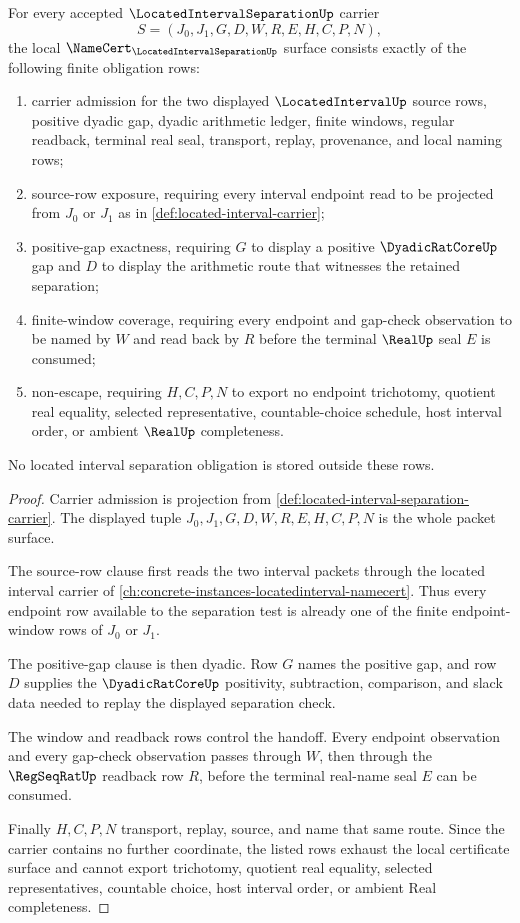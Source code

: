 \begin{theorem}
\label{thm:located-interval-separation-namecert-obligations}
For every accepted $\LocatedIntervalSeparationUp$ carrier
$$
S=(J_0,J_1,G,D,W,R,E,H,C,P,N),
$$
the local $\NameCert_{\LocatedIntervalSeparationUp}$ surface consists exactly of the following finite obligation rows:
\begin{enumerate}
\item carrier admission for the two displayed $\LocatedIntervalUp$ source rows, positive dyadic gap, dyadic arithmetic ledger, finite windows, regular readback, terminal real seal, transport, replay, provenance, and local naming rows;
\item source-row exposure, requiring every interval endpoint read to be projected from $J_0$ or $J_1$ as in \autoref{def:located-interval-carrier};
\item positive-gap exactness, requiring $G$ to display a positive $\DyadicRatCoreUp$ gap and $D$ to display the arithmetic route that witnesses the retained separation;
\item finite-window coverage, requiring every endpoint and gap-check observation to be named by $W$ and read back by $R$ before the terminal $\RealUp$ seal $E$ is consumed;
\item non-escape, requiring $H,C,P,N$ to export no endpoint trichotomy, quotient real equality, selected representative, countable-choice schedule, host interval order, or ambient $\RealUp$ completeness.
\end{enumerate}
No located interval separation obligation is stored outside these rows.
\end{theorem}
\begin{proof}
Carrier admission is projection from \autoref{def:located-interval-separation-carrier}. The displayed tuple $J_0,J_1,G,D,W,R,E,H,C,P,N$ is the whole packet surface.

The source-row clause first reads the two interval packets through the located interval carrier of \autoref{ch:concrete-instances-locatedinterval-namecert}. Thus every endpoint row available to the separation test is already one of the finite endpoint-window rows of $J_0$ or $J_1$.

The positive-gap clause is then dyadic. Row $G$ names the positive gap, and row $D$ supplies the $\DyadicRatCoreUp$ positivity, subtraction, comparison, and slack data needed to replay the displayed separation check.

The window and readback rows control the handoff. Every endpoint observation and every gap-check observation passes through $W$, then through the $\RegSeqRatUp$ readback row $R$, before the terminal real-name seal $E$ can be consumed.

Finally $H,C,P,N$ transport, replay, source, and name that same route. Since the carrier contains no further coordinate, the listed rows exhaust the local certificate surface and cannot export trichotomy, quotient real equality, selected representatives, countable choice, host interval order, or ambient Real completeness.
\end{proof}

